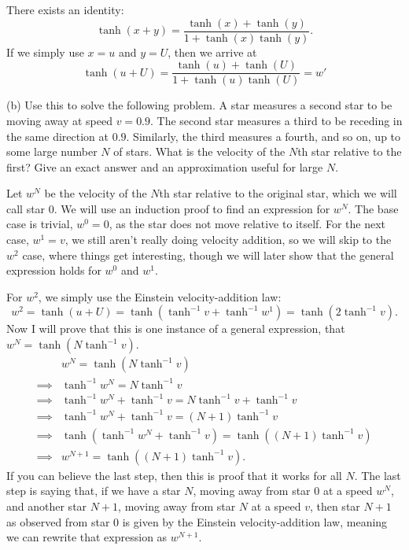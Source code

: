 \documentclass[gr-notes.tex]{subfiles}
\begin{document}
There exists an identity:
%
\begin{displaymath}
  \tanh(x+y) = \frac{\tanh(x) + \tanh(y)}{1 + \tanh(x) \tanh(y)}.
\end{displaymath}
%
If we simply use $x=u$ and $y=U$, then we arrive at
%
\begin{displaymath}
  \tanh(u+U) = \frac{\tanh(u) + \tanh(U)}{1 + \tanh(u) \tanh(U)} = w'
\end{displaymath}


(b) Use this to solve the following problem. A star measures a second star to be moving away at speed $v = 0.9$. The second star measures a third to be receding in the same direction at $0.9$. Similarly, the third measures a fourth, and so on, up to some large number $N$ of stars. What is the velocity of the $N$th star relative to the first? Give an exact answer and an approximation useful for large $N$.

Let $w^N$ be the velocity of the $N$th star relative to the original star, which we will call star $0$. We will use an induction proof to find an expression for $w^N$. The base case is trivial, $w^0 = 0$, as the star does not move relative to itself. For the next case, $w^1 = v$, we still aren't really doing velocity addition, so we will skip to the $w^2$ case, where things get interesting, though we will later show that the general expression holds for $w^0$ and $w^1$.

For $w^2$, we simply use the Einstein velocity-addition law:
%
\begin{displaymath}
  w^2 =
  \tanh(u + U) =
  \tanh(\tanh^{-1} v + \tanh^{-1} w^1) =
  \tanh(2 \tanh^{-1} v).
\end{displaymath}
%
Now I will prove that this is one instance of a general expression, that $w^N = \tanh(N \tanh^{-1} v)$.
%
\begin{align*}
  & w^N =
  \tanh(N \tanh^{-1} v)
  \\ \implies &
  \tanh^{-1} w^N =
  N \tanh^{-1} v
  \\ \implies &
  \tanh^{-1} w^N + \tanh^{-1} v =
  N \tanh^{-1} v + \tanh^{-1} v
  \\ \implies &
  \tanh^{-1} w^N + \tanh^{-1} v =
  (N+1) \tanh^{-1} v
  \\ \implies &
  \tanh( \tanh^{-1} w^N + \tanh^{-1} v ) =
  \tanh( (N+1) \tanh^{-1} v )
  \\ \implies &
  w^{N+1} =
  \tanh( (N+1) \tanh^{-1} v ).
\end{align*}
%
If you can believe the last step, then this is proof that it works for all $N$. The last step is saying that, if we have a star $N$, moving away from star $0$ at a speed $w^N$, and another star $N+1$, moving away from star $N$ at a speed $v$, then star $N+1$ as observed from star $0$ is given by the Einstein velocity-addition law, meaning we can rewrite that expression as $w^{N+1}$.
\end{document}
